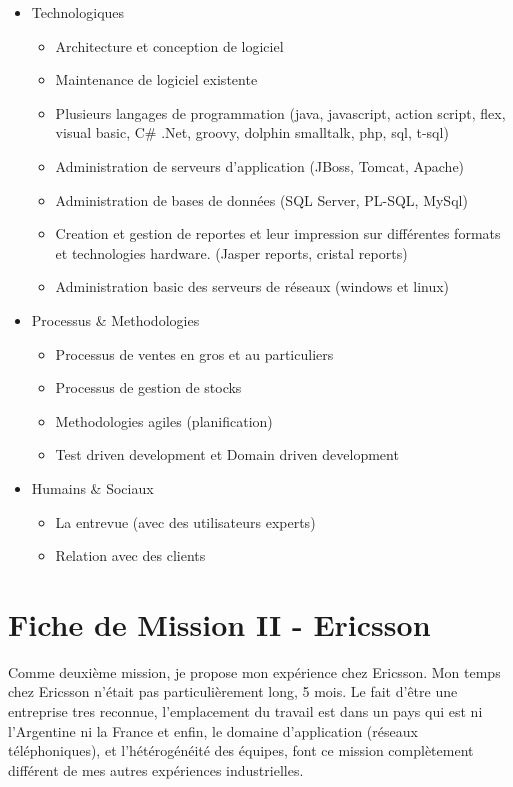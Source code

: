 \documentclass{resume} %
\begin{document}
	 \begin{itemize}  				
			\item Technologiques 
					 \begin{itemize} 
						\item Architecture et conception de logiciel 
						\item Maintenance de logiciel existente
						\item Plusieurs langages de programmation (java, javascript, action script, flex, visual basic, C\# .Net, groovy, dolphin smalltalk, php, sql, t-sql)
						\item Administration de serveurs d'application (JBoss, Tomcat, Apache)
						\item Administration de bases de données (SQL Server, PL-SQL, MySql)
						\item Creation et gestion de reportes et leur impression sur différentes formats et technologies hardware. (Jasper reports, cristal reports)
						\item Administration basic des serveurs de réseaux (windows et linux)
					\end {itemize}
			\item Processus \& Methodologies 
					 \begin{itemize} 
						\item Processus de ventes en gros et au particuliers 
						\item Processus de gestion de stocks 
						\item Methodologies agiles (planification) 
						\item Test driven development et Domain driven development
					\end {itemize}
			\item  Humains \& Sociaux  
				 \begin{itemize} 
						\item La entrevue (avec des utilisateurs experts)
						\item Relation avec des clients
					\end {itemize}

		 \end{itemize} 





\section{Fiche de Mission II - Ericsson }
Comme deuxième mission, je propose mon expérience chez Ericsson.
Mon temps chez Ericsson n'était pas particulièrement long, 5 mois. Le fait d'être une entreprise tres reconnue,  l'emplacement du travail est dans un pays qui est ni l'Argentine ni la France et enfin,  le domaine d'application (réseaux téléphoniques), et l'hétérogénéité des équipes, font ce mission complètement différent de mes autres expériences industrielles.
\end{document}
